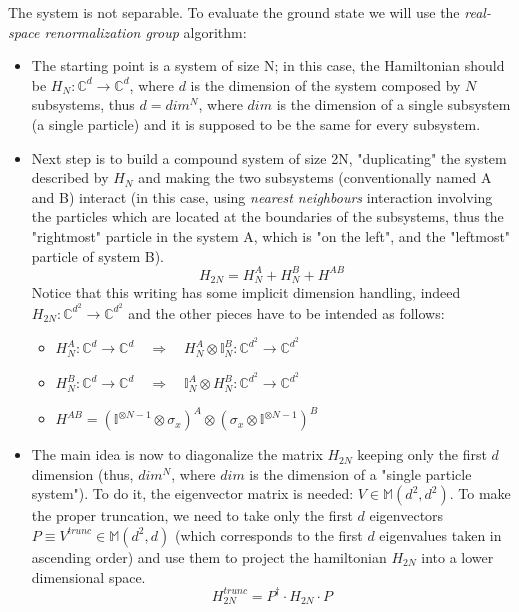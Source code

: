 \documentclass[12pt, a4paper, notitlepage]{report}
\begin{document}
The system is not separable. To evaluate the ground state we will use the \textit{real-space renormalization group} algorithm:
\begin{itemize}
	\item The starting point is a system of size N; in this case, the Hamiltonian should be $H_N:\mathbb{C}^d \to \mathbb{C}^d$, where $d$ is the dimension of the system composed by $N$ subsystems, thus $d=dim^N$, where $dim$ is the dimension of a single subsystem (a single particle) and it is supposed to be the same for every subsystem.
	
	\item Next step is to build a compound system of size 2N, "duplicating" the system described by $H_N$ and making the two subsystems (conventionally named A and B) interact (in this case, using \textit{nearest neighbours} interaction involving the particles which are located at the boundaries of the subsystems, thus the "rightmost" particle in the system A, which is "on the left", and the "leftmost" particle of system B).
	\begin{equation}
		H_{2N} = H^A_N + H^B_N + H^{AB}
	\end{equation}
	Notice that this writing has some implicit dimension handling, indeed $H_{2N}:\mathbb{C}^{d^2} \to \mathbb{C}^{d^2}$ and the other pieces have to be intended as follows:
	\begin{itemize}
		\item $H^A_N:\mathbb{C}^d \to \mathbb{C}^d \quad \Rightarrow \quad H^A_N \otimes \mathbb{I}^B_N : \mathbb{C}^{d^2} \to \mathbb{C}^{d^2}$
		\item $H^B_N:\mathbb{C}^d \to \mathbb{C}^d \quad \Rightarrow \quad \mathbb{I}^A_N \otimes H^B_N : \mathbb{C}^{d^2} \to \mathbb{C}^{d^2}$
		\item $H^{AB} = (\mathbb{I}^{\otimes N-1} \otimes \sigma_x)^A \otimes (\sigma_x \otimes \mathbb{I}^{\otimes N-1})^B $
	\end{itemize}

	\item The main idea is now to diagonalize the matrix $H_{2N}$ keeping only the first $d$ dimension (thus, $dim^{N}$, where $dim$ is the dimension of a "single particle system"). To do it, the eigenvector matrix is needed: $V \in \mathbb{M}(d^2,d^2)$. To make the proper truncation, we need to take only the first $d$ eigenvectors $P \equiv V^{trunc} \in \mathbb{M}(d^2,d)$ (which corresponds to the first $d$ eigenvalues taken in ascending order) and use them to project the hamiltonian $H_{2N}$ into a lower dimensional space.
	\begin{equation}
		H^{trunc}_{2N} = P^{\dagger} \cdot H_{2N} \cdot P
	\end{equation}
	

\end{itemize}
\end{document}
